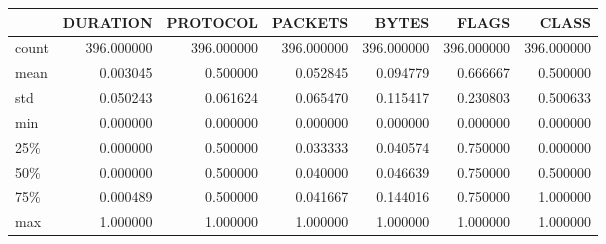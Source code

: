 \begin{tabular}{lrrrrrr}
\toprule
{} &    DURATION &    PROTOCOL &     PACKETS &       BYTES &       FLAGS &       CLASS \\
\midrule
count &  396.000000 &  396.000000 &  396.000000 &  396.000000 &  396.000000 &  396.000000 \\
mean  &    0.003045 &    0.500000 &    0.052845 &    0.094779 &    0.666667 &    0.500000 \\
std   &    0.050243 &    0.061624 &    0.065470 &    0.115417 &    0.230803 &    0.500633 \\
min   &    0.000000 &    0.000000 &    0.000000 &    0.000000 &    0.000000 &    0.000000 \\
25\%   &    0.000000 &    0.500000 &    0.033333 &    0.040574 &    0.750000 &    0.000000 \\
50\%   &    0.000000 &    0.500000 &    0.040000 &    0.046639 &    0.750000 &    0.500000 \\
75\%   &    0.000489 &    0.500000 &    0.041667 &    0.144016 &    0.750000 &    1.000000 \\
max   &    1.000000 &    1.000000 &    1.000000 &    1.000000 &    1.000000 &    1.000000 \\
\bottomrule
\end{tabular}
